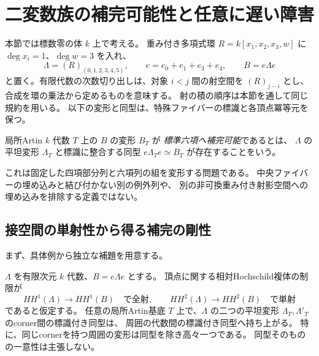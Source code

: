 \section{二変数族の補完可能性と任意に遅い障害}
\label{sec:completion-locus-v31}

本節では標数零の体 $k$ 上で考える。
重み付き多項式環 $R=k[x_1,x_2,x_3,w]$ に
$\deg x_i=1$、$\deg w=3$ を入れ、
\[
 \Lambda=(R)_{(0,1,2,3,4,5)},\qquad
 e=e_0+e_1+e_3+e_4,\qquad B=e\Lambda e
\]
と置く。有限代数の次数切り出しは、対象 $i<j$ 間の射空間を
$(R)_{j-i}$ とし、合成を環の乗法から定めるものを意味する。
射の積の順序は本節を通して同じ規約を用いる。
以下の変形と同型は、特殊ファイバーの標識と各頂点冪等元を保つ。

\begin{definition}[標準六項への補完]
局所Artin $k$ 代数 $T$ 上の $B$ の変形 $B_T$ が
\emph{標準六項へ補完可能}であるとは、
$\Lambda$ の平坦変形 $\Lambda_T$ と標識に整合する同型
$e\Lambda_Te\simeq B_T$ が存在することをいう。
\end{definition}

これは固定した四項部分列と六項列の組を変形する問題である。
中央ファイバーの埋め込みと結び付かない別の例外列や、
別の非可換重み付き射影空間への埋め込みを排除する定義ではない。

\subsection{接空間の単射性から得る補完の剛性}

まず、具体例から独立な補題を用意する。

\begin{lemma}[corner同型の持上げ]
\label{lem:corner-isomorphism-lifting-v31}
$\Lambda$ を有限次元 $k$ 代数、$B=e\Lambda e$ とする。
頂点に関する相対Hochschild複体の制限が
\[
 HH^1(\Lambda)\longrightarrow HH^1(B)\quad\text{で全射},
 \qquad
 HH^2(\Lambda)\longrightarrow HH^2(B)\quad\text{で単射}
\]
であると仮定する。
任意の局所Artin基底 $T$ 上で、$\Lambda$ の二つの平坦変形
$\Lambda_T,\Lambda'_T$ のcorner間の標識付き同型は、
周囲の代数間の標識付き同型へ持ち上がる。
特に、同じcornerを持つ周囲の変形は同型を除き高々一つである。
同型そのものの一意性は主張しない。
\end{lemma}

